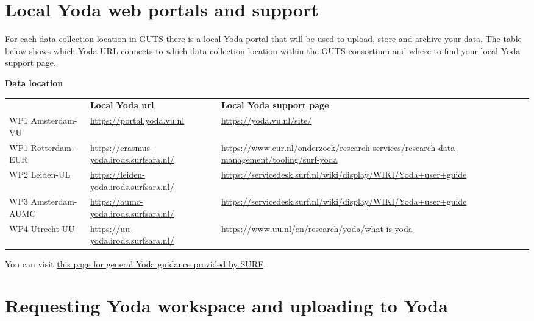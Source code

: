 \documentclass[
  letterpaper,
  DIV=11,
  numbers=noendperiod]{scrreprt}
\begin{document}
\section{Local Yoda web portals and
support}\label{local-yoda-web-portals-and-support}

For each data collection location in GUTS there is a local Yoda portal
that will be used to upload, store and archive your data. The table
below shows which Yoda URL connects to which data collection location
within the GUTS consortium and where to find your local Yoda support
page.

\label{yoda-table-1}
\textbf{Data location}

\begin{longtable}[]{@{}
  >{\raggedright\arraybackslash}p{}
  >{\raggedright\arraybackslash}p{}
  >{\raggedright\arraybackslash}p{}@{}}
\toprule\noalign{}
\endhead
\bottomrule\noalign{}
\endlastfoot
& \textbf{Local Yoda url} & \textbf{Local Yoda support page} \\
WP1 Amsterdam-VU & \url{https://portal.yoda.vu.nl} &
\url{https://yoda.vu.nl/site/} \\
WP1 Rotterdam-EUR & \url{https://erasmus-yoda.irods.surfsara.nl/} &
\url{https://www.eur.nl/onderzoek/research-services/research-data-management/tooling/surf-yoda} \\
WP2 Leiden-UL & \url{https://leiden-yoda.irods.surfsara.nl/} &
\url{https://servicedesk.surf.nl/wiki/display/WIKI/Yoda+user+guide} \\
WP3 Amsterdam-AUMC & \url{https://aumc-yoda.irods.surfsara.nl/} &
\url{https://servicedesk.surf.nl/wiki/display/WIKI/Yoda+user+guide} \\
WP4 Utrecht-UU & \url{https://uu-yoda.irods.surfsara.nl/} &
\url{https://www.uu.nl/en/research/yoda/what-is-yoda} \\
\end{longtable}

You can visit
\href{https://servicedesk.surf.nl/wiki/display/WIKI/Yoda+user+guide}{this
page for general Yoda guidance provided by SURF}.

\section{Requesting Yoda workspace and uploading to
Yoda}\label{requesting-yoda-workspace-and-uploading-to-yoda}
\end{document}
